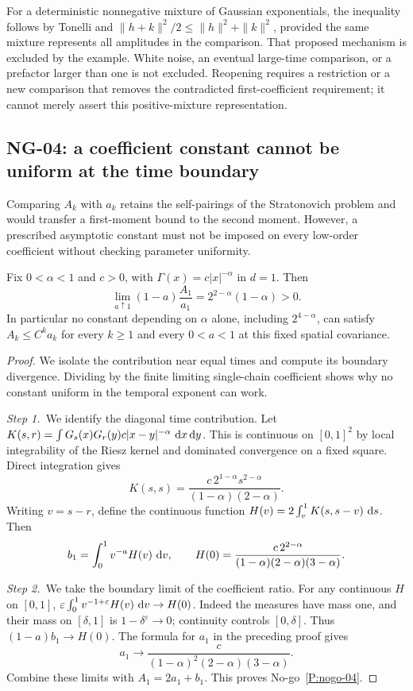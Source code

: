 For a deterministic nonnegative mixture of Gaussian exponentials, the
inequality follows by Tonelli and
$\|h+k\|^2/2\le\|h\|^2+\|k\|^2$, provided the same mixture represents
all amplitudes in the comparison. That proposed mechanism is excluded by
the example. White noise, an eventual large-time comparison, or a prefactor
larger than one is not excluded. Reopening requires a restriction or a new
comparison that removes the contradicted first-coefficient requirement;
it cannot merely assert this positive-mixture representation.

\subsection[NG-04: constants near the time boundary]{NG-04: a coefficient constant cannot be uniform at the time boundary}
\label{S:nogo-04}

Comparing $A_k$ with $a_k$ retains the self-pairings of the Stratonovich
problem and would transfer a first-moment bound to the second moment.
However, a prescribed asymptotic constant must not be imposed on every
low-order coefficient without checking parameter uniformity.

\setcounter{nogo}{3}
\begin{nogo}
  \label{P:nogo-04}
  Fix $0<\alpha<1$ and $c>0$, with $\Gamma(x)=c|x|^{-\alpha}$ in $d=1$.
  Then
  \[
    \lim_{a\uparrow1}(1-a)\frac{A_1}{a_1}
    =2^{2-\alpha}(1-\alpha)>0.
  \]
  In particular no constant depending on $\alpha$ alone, including
  $2^{4-\alpha}$, can satisfy $A_k\le C^k a_k$ for every $k\ge1$
  and every $0<a<1$ at this fixed spatial covariance.
\end{nogo}
\begin{proof}
  We isolate the contribution near equal times and compute its boundary
  divergence. Dividing by the finite limiting single-chain coefficient shows
  why no constant uniform in the temporal exponent can work.


  \medskip
  \noindent\textit{Step 1.~}We identify the diagonal time contribution.
  Let
  $K(s,r)=\int G_s(x)G_r(y)c|x-y|^{-\alpha}\,\,\mathrm{d} x\,\mathrm{d} y$.
  This is continuous on $[0,1]^2$ by local integrability of the Riesz kernel
  and dominated convergence on a fixed square. Direct integration gives
  \[
    K(s,s)=\frac{c\,2^{1-\alpha}s^{2-\alpha}}
    {(1-\alpha)(2-\alpha)}.
  \]
  Writing $v=s-r$, define the continuous function
  $H(v)=2\int_v^1 K(s,s-v)\,\,\mathrm{d} s$. Then
  \[
    b_1=\int_0^1v^{-a}H(v)\,\,\mathrm{d} v,\qquad
    H(0)=\frac{c\,2^{2-\alpha}}
    {(1-\alpha)(2-\alpha)(3-\alpha)}.
  \]

  \medskip
  \noindent\textit{Step 2.~}We take the boundary limit of the coefficient
  ratio.
  For any continuous $H$ on $[0,1]$,
  $\varepsilon\int_0^1v^{-1+\varepsilon}H(v)\,\,\mathrm{d} v\to H(0)$.
  Indeed the measures have mass one, and their mass on $[\delta,1]$ is
  $1-\delta^\varepsilon\to0$; continuity controls $[0,\delta]$.
  Thus $(1-a)b_1\to H(0)$. The formula for $a_1$ in the preceding proof gives
  \[
    a_1\longrightarrow
    \frac{c}{(1-\alpha)^2(2-\alpha)(3-\alpha)}.
  \]
  Combine these limits with $A_1=2a_1+b_1$.
  This proves No-go~\ref{P:nogo-04}.
\end{proof}

